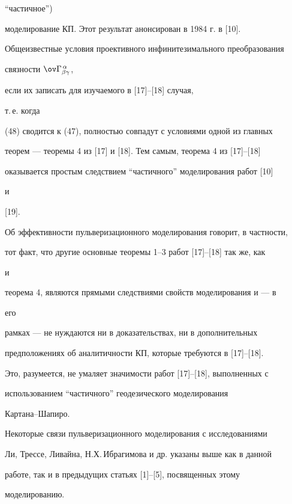 ``частичное'') 


моделирование КП. Этот результат анонсирован в 1984 г. в [10]. 


Общеизвестные условия проективного инфинитезимального преобразования 


связности $\ov\Gamma^{\,\alpha}_{\beta\gamma}$, 


если их записать для изучаемого в [17]--[18] случая, 


т.\,е. когда 


(48) сводится к (47), полностью совпадут с условиями одной из главных 


теорем --- теоремы 4 из [17] и [18]. Тем самым, теорема 4 из [17]--[18] 


оказывается простым следствием ``частичного'' моделирования работ [10] 


и 


[19]. 


 


Об эффективности пульверизационного моделирования говорит, в частности, 


тот факт, что другие основные теоремы 1--3 работ [17]--[18] так же, как 


и 


теорема 4, являются прямыми следствиями свойств моделирования и --- в 


его 


рамках --- не нуждаются ни в доказательствах, ни в дополнительных 


предположениях об аналитичности КП, которые требуются в [17]--[18]. 


Это, разумеется, не умаляет значимости работ [17]--[18], выполненных с 


использованием ``частичного'' геодезического моделирования 


Картана--Шапиро. 


 


Некоторые связи пульверизационного моделирования с исследованиями 


Ли, Трессе, Ливайна, Н.Х.\,Ибрагимова и др. указаны выше как в данной 


работе, так и в предыдущих статьях [1]--[5], посвященных этому 


моделированию. 


